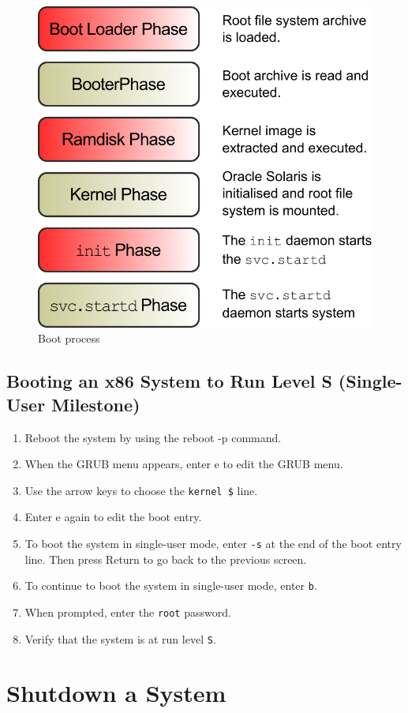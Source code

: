 \documentclass[10pt,a4paper,twoside]{report}
\begin{document}
\begin{figure}
\includegraphics[height=0.4\textheight]{Solaris_BootSequence.pdf}
\caption{Boot process} 
\end{figure}
\subsection{Booting an x86 System to Run Level S (Single-User Milestone)}
\begin{enumerate}
\item Reboot the system by using the reboot -p command.
\item When the GRUB menu appears, enter e to edit the GRUB menu.
\item Use the arrow keys to choose the \verb+kernel $+ line.
\item Enter e again to edit the boot entry.
\item To boot the system in single-user mode, enter \verb+-s+ at the end of the boot entry line. Then press Return to go back to the previous screen.
\item To continue to boot the system in single-user mode, enter \verb+b+.
\item When prompted, enter the \verb+root+ password.
\item Verify that the system is at run level \verb+S+.
\end{enumerate}
\section{Shutdown a System}
\end{document}
